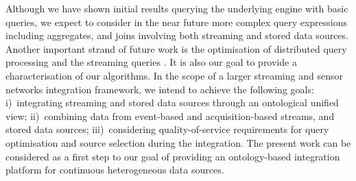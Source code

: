 Although we have shown initial results querying the underlying \snee engine with basic queries, we expect to consider in the near future more complex query expressions including aggregates, and joins involving both streaming and stored data sources.
Another important strand of future work is the optimisation of distributed query processing \cite{Kossmann_00} and the streaming queries \cite{Abadi_2005,Galpin_09}.
It is also our goal to provide a characterisation of our algorithms. 
In the scope of a larger streaming and sensor networks integration framework, we intend to achieve the following goals: %
i)~integrating streaming and stored data sources through an ontological unified view; %
ii)~combining data from event-based and acquisition-based streams, and stored data sources; %
iii)~considering quality-of-service requirements for query optimisation and source selection during the integration.
The present work can be considered as a first step to our goal of providing an ontology-based integration platform for continuous heterogeneous data sources. 

